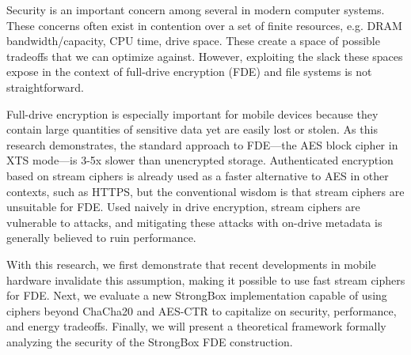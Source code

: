 \abstract
Security is an important concern among several in modern computer systems. These
concerns often exist in contention over a set of finite resources, e.g. DRAM
bandwidth/capacity, CPU time, drive space. These create a space of possible
tradeoffs that we can optimize against. However, exploiting the slack these
spaces expose in the context of full-drive encryption (FDE) and file systems is
not straightforward.

Full-drive encryption is especially important for mobile devices because they
contain large quantities of sensitive data yet are easily lost or stolen. As
this research demonstrates, the standard approach to FDE—the AES block cipher in
XTS mode—is 3-5x slower than unencrypted storage. Authenticated encryption based
on stream ciphers is already used as a faster alternative to AES in other
contexts, such as HTTPS, but the conventional wisdom is that stream ciphers are
unsuitable for FDE. Used naively in drive encryption, stream ciphers are
vulnerable to attacks, and mitigating these attacks with on-drive metadata is
generally believed to ruin performance.

With this research, we first demonstrate that recent developments in mobile
hardware invalidate this assumption, making it possible to use fast stream
ciphers for FDE. Next, we evaluate a new StrongBox implementation capable of
using ciphers beyond ChaCha20 and AES-CTR to capitalize on security,
performance, and energy tradeoffs. Finally, we will present a theoretical
framework formally analyzing the security of the StrongBox FDE construction.
